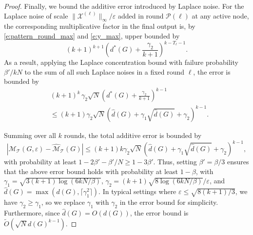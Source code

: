 \begin{proof}
Finally, we bound the additive error introduced by Laplace noise.
For the Laplace noise of scale $\|\mathcal{X}^{(\ell)}\|_\infty/\varepsilon$ added in round $\mathcal{P}(\ell)$ at any active node, the corresponding multiplicative factor in the final output is, by \eqref{e:pattern_round_max} and \eqref{e:y_max}, upper bounded by
\begin{equation*}
    (k+1)^{k+1} (d^*(G) + \frac{\gamma_2}{k+1} )^{k -T_\ell-1}.
\end{equation*}
As a result, applying the Laplace concentration bound with failure probability $\beta'/kN$ to the sum of all such Laplace noises in a fixed round $\ell$, the error is bounded by
\begin{align*}
    &(k+1)^k \,\gamma_2 \sqrt{N} (d^*(G) + \frac{\gamma_2}{k+1} )^{k - 1} \\
    &\leq (k+1) \gamma_2 \sqrt{N} (\hat{d}(G) + \gamma_1 \sqrt{\hat{d}(G)} + \gamma_2 )^{k - 1}.
\end{align*}

Summing over all $k$ rounds, the total additive error is bounded by
\begin{equation*}
    |\mathcal{M}_{\mathcal{T}}(G, \varepsilon) - 
    \widehat{\mathcal{M}}_{\mathcal{T}}(G)| \leq (k+1)k \gamma_2 \sqrt{N} (\hat{d}(G) + \gamma_1 \sqrt{\hat{d}(G)} + \gamma_2 )^{k - 1},
\end{equation*}
with probability at least $1 - 2 \beta' - \beta'/N \geq 1 - 3\beta'$.
Thus, setting $\beta' = \beta/3$ ensures that the above error bound holds with probability at least $1 - \beta$, with
$\gamma_1 = \sqrt{3(k+1)\log(6kN/\beta)}$, $\gamma_2 = (k+1)\sqrt{8\log(6kN/\beta)}/\varepsilon$, and $\hat{d}(G) = \max(d(G), \lceil \gamma_1^2 \rceil)$.
In typical settings where $\varepsilon \leq \sqrt{8(k+1)/3}$, we have $\gamma_2 \geq \gamma_1$, so we replace $\gamma_1$ with $\gamma_2$ in the error bound for simplicity.
Furthermore, since $\hat{d}(G) = O(d(G))$, the error bound is $\tilde{O}(\sqrt{N} d(G)^{k - 1})$. \qedhere



\end{proof}

